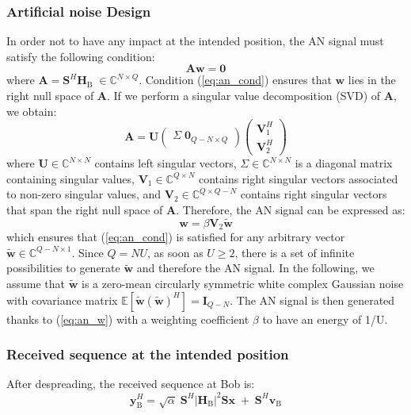\documentclass[journal,comsoc]{IEEEtran}
\newcommand{\module}[1]{\left|#1\right|}
\newcommand{\EX}[1]{\mathbb{E} \left[#1\right]}%
\newcommand{\HB}{\textbf{H}_{\text{B}}}
\newcommand{\spread}{\textbf{S}}
\newcommand{\w}{\textbf{w}}
\newcommand{\C}{\mathbb{C}}
\begin{document}
%
\subsubsection{Artificial noise Design}\label{sec:artificial-noise-design}
In order not to have any impact at the intended position, the AN signal must satisfy the following condition:
\begin{equation}
	\textbf{A} \w \; = \; \textbf{0}
	\label{eq:an_cond}
\end{equation}
where $\textbf{A} = \spread^H\HB\; \in \C^{N\times Q}$. Condition (\ref{eq:an_cond}) ensures that $\w$ lies in the right null space of $\textbf{A}$. If we perform a singular value decomposition (SVD) of $\textbf{A}$, we obtain:
\begin{equation}
	\textbf{A} = \textbf{U} 
	\begin{pmatrix}
		\Sigma \; \textbf{0}_{Q-N\times Q}
	\end{pmatrix}
	\begin{pmatrix}
		\textbf{V}_1^H \\
		\textbf{V}_2^H
	\end{pmatrix}
	\label{eq:an_svd}
\end{equation}
where $\textbf{U} \in \C^{N \times N}$ contains left singular vectors, $\Sigma \in \C^{N \times N}$ is a diagonal matrix containing singular values, $\textbf{V}_1 \in \C^{Q \times N}$ contains right singular vectors associated to non-zero singular values, and $\textbf{V}_2 \in \C^{Q \times Q-N}$ contains right singular vectors that span the right null space of $\textbf{A}$. Therefore, the AN signal can be expressed as:
\begin{equation}
	\w = \beta \textbf{V}_2 \tilde{\w}
	\label{eq:an_w}
\end{equation}
which ensures that (\ref{eq:an_cond}) is satisfied for any arbitrary vector $\tilde{\w} \in \C^{Q-N \times 1}$. Since $Q = NU$, as soon as $U\geq 2$, there is a set of infinite possibilities to generate $\tilde{\w}$ and therefore the AN signal. In the following, we assume that $\tilde{\w}$ is a zero-mean circularly symmetric white complex Gaussian noise with covariance matrix $\EX{\tilde{\w}(\tilde{\w})^H} = \textbf{I}_{Q-N }$. The AN signal is then generated thanks to (\ref{eq:an_w}) with a weighting coefficient $\beta$ to have an energy of 1/U.


\subsubsection{Received sequence at the intended position}
After despreading, the received sequence at Bob is: 
\begin{equation}
	\textbf{y}_{\text{B}}^H = \sqrt{\alpha} \; \spread^H \module{\HB}^2 \spread \textbf{x} \;  +  \;  \spread^H \textbf{v}_\text{B} 
	\label{eq:rx_bob_AN}
\end{equation}
\end{document}
